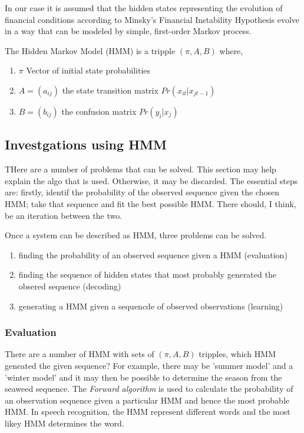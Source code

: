 \documentclass[12pt, a4paper, oneside]{article} %
\begin{document}
In our case it is assumed that the hidden states representing the evolution of financial conditions according to Minsky's Financial Instability Hypothesis evolve in a way that can be modeled by simple, first-order Markov process. 
 
The Hidden Markov Model (HMM) is a tripple $(\pi, A, B)$ where, 
\begin{enumerate}
\item $\pi$ Vector of initial state probabilities
\item $A = (a_{ij})$ the state transition matrix $Pr(x_{it}|x_{jt-1})$
\item $B = (b_{ij})$ the confusion matrix $Pr(y_i|x_j)$
\end{enumerate}


\subsection{Investgations using HMM}
THere are a number of problems that can be solved.  This section may help explain the algo that is used. Otherwise, it may be discarded.  The essential steps are:  firstly, identif the probability of the observed sequence given the chosen HMM; take that sequence and fit the best possible HMM.  There should, I think, be an iteration between the two. 

Once a system can be described as HMM, three problems can be solved. 
\begin{enumerate}
\item finding the probability of an observed sequence given a HMM (evaluation)
\item finding the sequence of hidden states that most probably generated the obsered sequence (decoding)
\item generating a HMM given a sequencde of observed observations (learning)
\end{enumerate}

\subsubsection{Evaluation}
There are a number of HMM with sets of $(\pi, A, B)$ tripples, which HMM geneated the given sequence?  For example, there may be 'summer model' and a 'winter model' and it may then be possible to determine the season from the seaweed sequence. The \emph{Forward algorithm} is used to calculate the probability of an observation sequence given a particular HMM and hence the most probable HMM.  In speech recognition, the HMM represent different words and the most likey HMM determines the word. 
\end{document}
